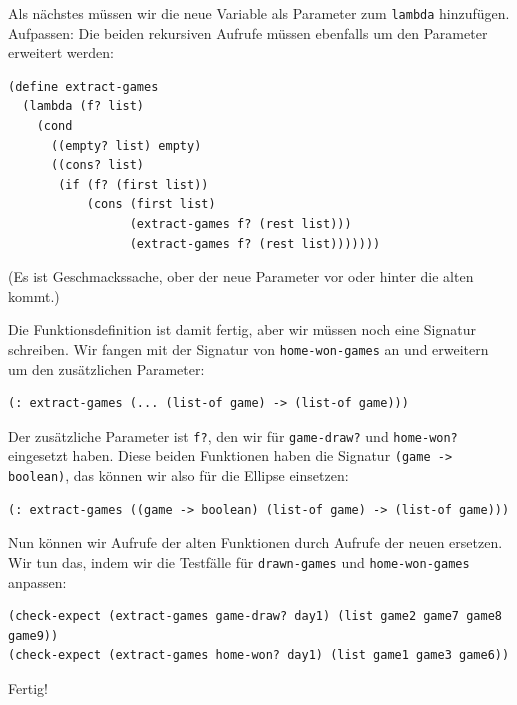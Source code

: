 %
Als nächstes müssen wir die neue Variable als Parameter zum
\lstinline{lambda} hinzufügen.  Aufpassen: Die beiden rekursiven
Aufrufe müssen ebenfalls um den Parameter erweitert werden:
%
\begin{lstlisting}
(define extract-games
  (lambda (f? list)
    (cond
      ((empty? list) empty)
      ((cons? list)
       (if (f? (first list))
           (cons (first list)
                 (extract-games f? (rest list)))
                 (extract-games f? (rest list)))))))
\end{lstlisting}
%
(Es ist Geschmackssache, ober der neue Parameter vor oder hinter die
alten kommt.)

Die Funktionsdefinition ist damit fertig, aber wir müssen noch eine
Signatur schreiben.  Wir fangen mit der Signatur von
\lstinline{home-won-games} an und erweitern um den zusätzlichen
Parameter:
%
\begin{lstlisting}
(: extract-games (... (list-of game) -> (list-of game)))
\end{lstlisting}
%
Der zusätzliche Parameter ist \lstinline{f?}, den wir für
\lstinline{game-draw?} und \lstinline{home-won?} eingesetzt haben.
Diese beiden Funktionen haben die Signatur
\lstinline{(game -> boolean)}, das können wir also für die Ellipse
einsetzen:
%
\begin{lstlisting}
(: extract-games ((game -> boolean) (list-of game) -> (list-of game)))
\end{lstlisting}
%
Nun können wir Aufrufe der alten Funktionen durch Aufrufe der neuen
ersetzen.  Wir tun das, indem wir die Testfälle für
\lstinline{drawn-games} und \lstinline{home-won-games} anpassen:
%
\begin{lstlisting}
(check-expect (extract-games game-draw? day1) (list game2 game7 game8 game9))
(check-expect (extract-games home-won? day1) (list game1 game3 game6))
\end{lstlisting}
%
Fertig!


